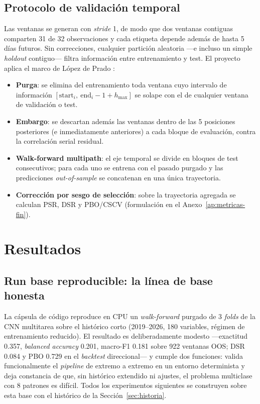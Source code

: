 \documentclass[11pt,a4paper]{article}
\begin{document}
\subsection{Protocolo de validación temporal}
\label{sec:validacion}
Las ventanas se generan con \emph{stride} 1, de modo que dos ventanas contiguas
comparten 31 de 32 observaciones y cada etiqueta depende además de hasta 5 días
futuros. Sin correcciones, cualquier partición aleatoria —e incluso un simple
\emph{holdout} contiguo— filtra información entre entrenamiento y test. El
proyecto aplica el marco de López de Prado \cite{lopezdeprado2018advances}:

\begin{itemize}
  \item \textbf{Purga}: se elimina del entrenamiento toda ventana cuyo intervalo
        de información $[\mathrm{start}_i,\ \mathrm{end}_i - 1 + h_{\max}]$ se
        solape con el de cualquier ventana de validación o test.
  \item \textbf{Embargo}: se descartan además las ventanas dentro de las 5
        posiciones posteriores (e inmediatamente anteriores) a cada bloque de
        evaluación, contra la correlación serial residual.
  \item \textbf{Walk-forward multipath}: el eje temporal se divide en bloques de
        test consecutivos; para cada uno se entrena con el pasado purgado y las
        predicciones \emph{out-of-sample} se concatenan en una única trayectoria.
  \item \textbf{Corrección por sesgo de selección}: sobre la trayectoria agregada
        se calculan PSR, DSR y PBO/CSCV \cite{bailey2012sharpe,bailey2014deflated,
        bailey2017probability} (formulación en el Anexo~\ref{ap:metricas-fin}).
\end{itemize}

\section{Resultados}
\subsection{Run base reproducible: la línea de base honesta}
\label{sec:runbase}
La cápsula de código reproduce en CPU un \emph{walk-forward} purgado de 3
\emph{folds} de la CNN multitarea sobre el histórico corto (2019--2026, 180
variables, régimen de entrenamiento reducido). El resultado es deliberadamente
modesto —exactitud 0.357, \emph{balanced accuracy} 0.201, macro-F1 0.181 sobre
922 ventanas OOS; DSR 0.084 y PBO 0.729 en el \emph{backtest} direccional— y
cumple dos funciones: valida funcionalmente el \emph{pipeline} de extremo a
extremo en un entorno determinista y deja constancia de que, sin histórico
extendido ni ajustes, el problema multiclase con 8 patrones es difícil. Todos los
experimentos siguientes se construyen sobre esta base con el histórico de la
Sección~\ref{sec:historia}.
\end{document}
